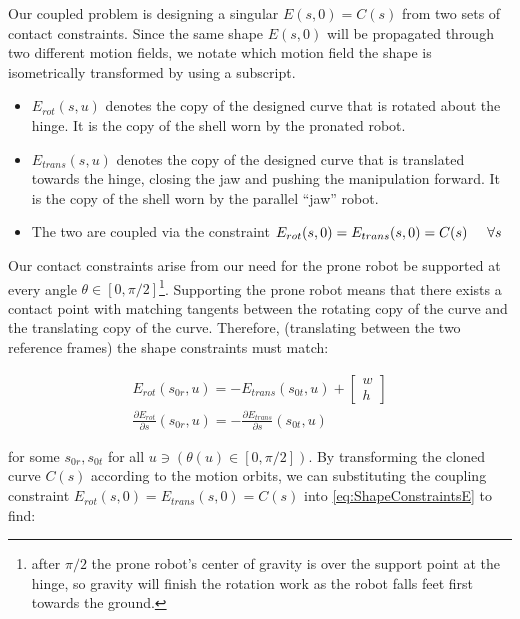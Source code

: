 \documentclass[letterpaper, 10 pt, conference]{ieeeconf}
\begin{document}
Our coupled problem is designing a singular $E(s,0) = C(s)$ from two sets of contact constraints.
Since the same shape $E(s,0)$ will be propagated through two different motion fields, we notate which motion field the shape is isometrically transformed by using a subscript.
\begin{itemize}
  \item $E_{rot}(s,u)$ denotes the copy of the designed curve that is rotated about the hinge. It is the copy of the shell worn by the pronated robot.
  \item$E_{trans}(s,u)$ denotes the copy of the designed curve that is translated towards the hinge, closing the jaw and pushing the manipulation forward. It is the copy of the shell worn by the parallel ``jaw'' robot.
  \item The two are coupled via the constraint $E_{rot}(s,0) = E_{trans}(s,0) = C(s) \hspace{5mm} \forall s$
\end{itemize}

Our contact constraints arise from our need for the prone robot be supported at every angle $\theta \in [0,\pi/2]$\footnote{after $\pi/2$ the prone robot's center of gravity is over the support point at the hinge, so gravity will finish the rotation work as the robot falls feet first towards the ground.}.
Supporting the prone robot means that there exists a contact point with matching tangents between the rotating copy of the curve and the translating copy of the curve.
Therefore, (translating between the two reference frames) the shape constraints must match:

\begin{align}
  E_{rot}(s_{0r},u) = -E_{trans}(s_{0t},u) +\begin{bmatrix}w \\ h\end{bmatrix} \\
  \frac{\partial E_{rot}}{\partial s}(s_{0r},u) = - \frac{\partial E_{trans}}{\partial s}(s_{0t},u)
  \label{eq:ShapeConstraintsE}
\end{align}

for some $s_{0r},s_{0t}$ for all $u \ni (\theta(u) \in [0,\pi/2])$.
By transforming the cloned curve $C(s)$ according to the motion orbits, we can substituting the coupling constraint $E_{rot}(s,0) = E_{trans}(s,0) = C(s)$ into \ref{eq:ShapeConstraintsE} to find:
\end{document}
